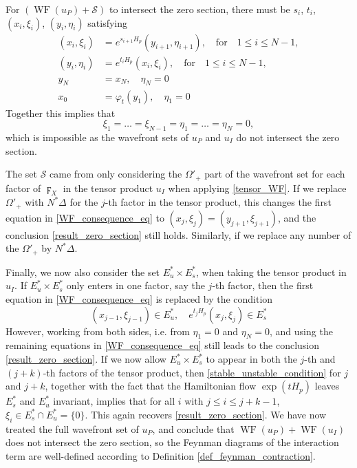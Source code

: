 \documentclass[reqno]{amsart}
\theoremstyle{definition}
\theoremstyle{remark}
\renewcommand{\phi}{\varphi}
\DeclareMathOperator{\WF}{WF}
\begin{document}
For $(\WF(u_P)+\mathcal{S})$ to intersect the zero section, there must be $s_i$, $t_i$, $(x_i,\xi_i)$, $(y_i,\eta_i)$ satisfying
\begin{equation}
\label{WF_consequence_eq}
\begin{split}
    (x_i,\xi_i) &= e^{s_{i+1}H_p}(y_{i+1},\eta_{i+1}), \quad \mathrm{for}\quad 1\le i\le N-1, \\
    (y_i,\eta_i) &= e^{t_{i}H_p}(x_{i},\xi_{i}), \quad \mathrm{for}\quad 1\le i\le N-1, \\
    y_N&=x_N, \quad \eta_N=0 \\
    x_0&=\phi_t(y_1), \quad \eta_1=0
\end{split}
\end{equation}
Together this implies that 
\begin{equation}
\label{result_zero_section}
    \xi_1=\dots=\xi_{N-1}=\eta_1=\dots=\eta_N=0,
\end{equation}
which is impossible as the wavefront sets of $u_P$ and $u_I$ do not intersect the zero section.

The set $\mathcal{S}$ came from only considering the $\Omega'_+$ part of the wavefront set for each factor of $\digamma_X$ in the tensor product $u_I$ when applying \eqref{tensor_WF}. If we replace $\Omega'_+$ with $N^*\Delta$ for the $j$-th factor in the tensor product, this changes the first equation in \eqref{WF_consequence_eq} to $(x_j,\xi_j)=(y_{j+1},\xi_{j+1})$, and the conclusion \eqref{result_zero_section} still holds. Similarly, if we replace any number of the $\Omega'_+$ by $N^*\Delta$.

Finally, we now also consider the set $E^*_u\times E^*_s$, when taking the tensor product in $u_I$. If $E_u^*\times E_s^*$ only enters in one factor, say the $j$-th factor, then the first equation in \eqref{WF_consequence_eq} is replaced by the condition 
\begin{equation}
\label{stable_unstable_condition}
    (x_{j-1},\xi_{j-1})\in E^*_u, \quad e^{t_jH_p}(x_j,\xi_j)\in E^*_s
\end{equation}
However, working from both sides, i.e. from $\eta_1=0$ and $\eta_N=0$, and using the remaining equations in \eqref{WF_consequence_eq} still leads to the conclusion \eqref{result_zero_section}. If we now allow $E^*_u\times E^*_s$ to appear in both the $j$-th and $(j+k)$-th factors of the tensor product, then \eqref{stable_unstable_condition} for $j$ and $j+k$, together with the fact that the Hamiltonian flow $\exp(tH_p)$ leaves $E^*_s$ and $E^*_u$ invariant, implies that for all $i$ with $j \le i \le j+k-1$, $\xi_i \in E^*_s\cap E^*_u = \{0\}$. This again recovers \eqref{result_zero_section}. We have now treated the full wavefront set of $u_P$, and conclude that $\WF(u_P)+\WF(u_I)$ does not intersect the zero section, so the Feynman diagrams of the interaction term are well-defined according to Definition \ref{def_feynman_contraction}.
\end{document}
